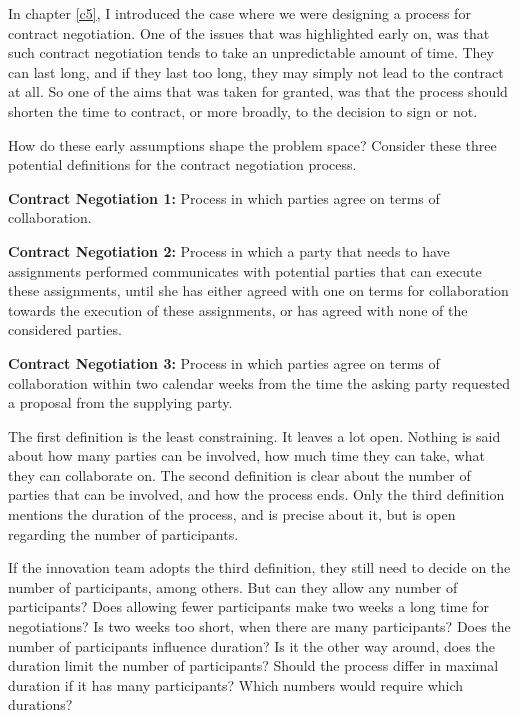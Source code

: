\documentclass[graybox,envcountchap,sectrefs]{svmono}
\begin{document}
In chapter \ref{c5}, I introduced the case where we were designing a process for contract negotiation. One of the issues that was highlighted early on, was that such contract negotiation tends to take an unpredictable amount of time. They can last long, and if they last too long, they may simply not lead to the contract at all. So one of the aims that was taken for granted, was that the process should shorten the time to contract, or more broadly, to the decision to sign or not.

How do these early assumptions shape the problem space? Consider these three potential definitions for the contract negotiation process.

\begin{svgraybox}
\textbf{Contract Negotiation 1:} Process in which parties agree on terms of collaboration.

\noindent\textbf{Contract Negotiation 2:} Process in which a party that needs to have assignments performed communicates with potential parties that can execute these assignments, until she has either agreed with one on terms for collaboration towards the execution of these assignments, or has agreed with none of the considered parties.

\noindent\textbf{Contract Negotiation 3:} Process in which parties agree on terms of collaboration within two calendar weeks from the time the asking party requested a proposal from the supplying party.
\end{svgraybox}

The first definition is the least constraining. It leaves a lot open. Nothing is said about how many parties can be involved, how much time they can take, what they can collaborate on. The second definition is clear about the number of parties that can be involved, and how the process ends. Only the third definition mentions the duration of the process, and is precise about it, but is open regarding the number of participants.

If the innovation team adopts the third definition, they still need to decide on the number of participants, among others. But can they allow any number of participants? Does allowing fewer participants make two weeks a long time for negotiations? Is two weeks too short, when there are many participants? Does the number of participants influence duration? Is it the other way around, does the duration limit the number of participants? Should the process differ in maximal duration if it has many participants? Which numbers would require which durations?
\end{document}
